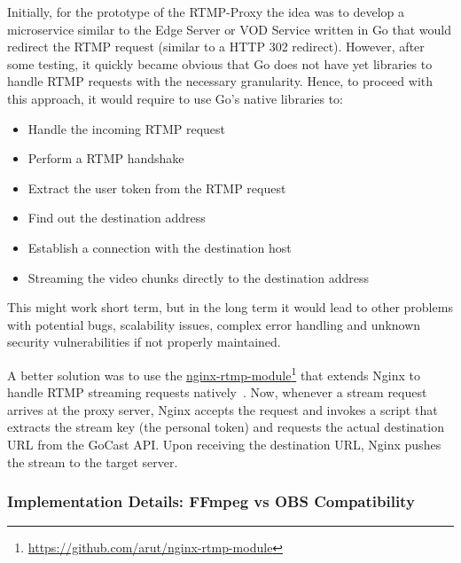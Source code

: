 Initially, for the prototype of the RTMP-Proxy the idea was to develop a microservice similar to the Edge Server or VOD Service written in Go that would redirect the \ac{RTMP} request (similar to a HTTP 302 redirect). However, after some testing, it quickly became obvious that Go does not have yet libraries to handle \ac{RTMP} requests with the necessary granularity. Hence, to proceed with this approach, it would require to use Go's native libraries to: 
\begin{itemize}
\item Handle the incoming \ac{RTMP} request
\item Perform a \ac{RTMP} handshake
\item Extract the user token from the \ac{RTMP} request
\item Find out the destination address
\item Establish a connection with the destination host
\item Streaming the video chunks directly to the destination address
\end{itemize}

This might work short term, but in the long term it would lead to other problems with potential bugs, scalability issues, complex error handling and unknown security vulnerabilities if not properly maintained.

A better solution was to use the \href{https://github.com/arut/nginx-rtmp-module}{nginx-rtmp-module}\footnote{\url{https://github.com/arut/nginx-rtmp-module}} that extends Nginx to handle \ac{RTMP} streaming requests natively~\parencite{nginx_rtmp_module}. 
Now, whenever a stream request arrives at the proxy server, Nginx accepts the request and invokes a script that extracts the stream key (the personal token) and requests the actual destination URL from the GoCast \ac{API}. Upon receiving the destination URL, Nginx pushes the stream to the target server.

\subsubsection{Implementation Details: FFmpeg vs OBS Compatibility}

